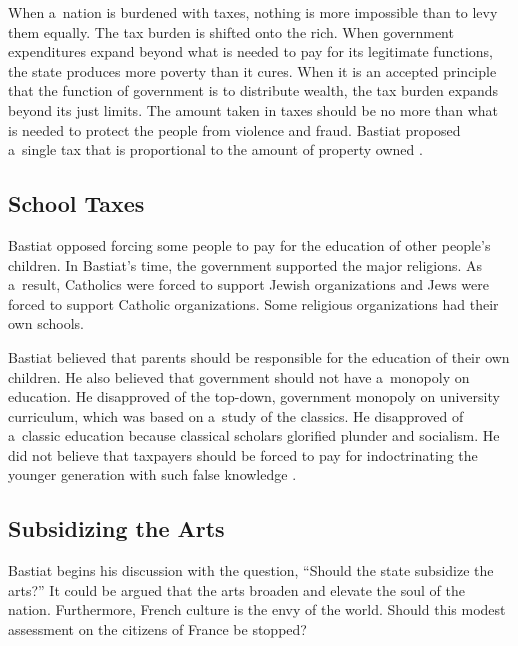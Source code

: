 When a~nation is burdened with taxes, nothing is more impossible than to levy them equally. The tax burden is shifted onto the rich. When government expenditures expand beyond what is needed to pay for its legitimate functions, the state produces more poverty than it cures. When it is an accepted principle that the function of government is to distribute wealth, the tax burden expands beyond its just limits. The amount taken in taxes should be no more than what is needed to protect the people from violence and fraud. Bastiat proposed a~single tax that is proportional to the amount of property owned 
\parencite[][pp.125–126]{bastiat_selected_1964}.%




\subsection{School Taxes }



Bastiat opposed forcing some people to pay for the education of other people's children. In Bastiat's time, the government supported the major religions. As a~result, Catholics were forced to support Jewish organizations and Jews were forced to support Catholic organizations. Some religious organizations had their own schools.



Bastiat believed that parents should be responsible for the education of their own children. He also believed that government should not have a~monopoly on education. He disapproved of the top-down, government monopoly on university curriculum, which was based on a~study of the classics. He disapproved of a~classic education because classical scholars glorified plunder and socialism. He did not believe that taxpayers should be forced to pay for indoctrinating the younger generation with such false knowledge 
\parencite[][pp.278–283]{bastiat_selected_1964}.%




\subsection{Subsidizing the Arts}



Bastiat begins his discussion with the question, ``Should the state subsidize the arts?'' 
\parencite[][p.11]{bastiat_selected_1964} %
 It could be argued that the arts broaden and elevate the soul of the nation. Furthermore, French culture is the envy of the world. Should this modest assessment on the citizens of France be stopped?




